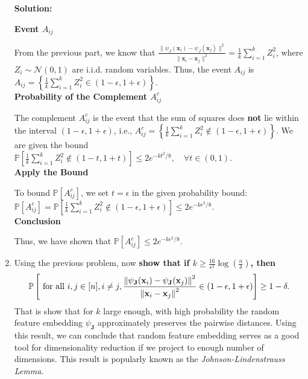 \documentclass{article}
\newcommand{\mat}[1]{\mathbf{#1}}
\renewcommand{\vec}[1]{\boldsymbol{\mathbf{#1}}}
\newenvironment{solution}{\color{blue} \smallskip \textbf{Solution:}}{}
\begin{document}
\begin{enumerate}
\begin{solution}

\textbf{Event \(A_{ij}\)}

From the previous part, we know that \( \frac{\|\psi_J(\mathbf{x}_i) - \psi_J(\mathbf{x}_j)\|^2}{\|\mathbf{x}_i - \mathbf{x}_j\|^2} = \frac{1}{k} \sum_{i=1}^{k} Z_i^2 \), where \(Z_i \sim \mathcal{N}(0,1)\) are i.i.d. random variables. Thus, the event \(A_{ij}\) is \( A_{ij} = \left\{ \frac{1}{k} \sum_{i=1}^{k} Z_i^2 \in (1 - \epsilon, 1 + \epsilon) \right\} \).\\

\textbf{Probability of the Complement \(A_{ij}^c\)}

The complement \(A_{ij}^c\) is the event that the sum of squares does \textbf{not} lie within the interval \((1 - \epsilon, 1 + \epsilon)\), i.e., \( A_{ij}^c = \left\{ \frac{1}{k} \sum_{i=1}^{k} Z_i^2 \notin (1 - \epsilon, 1 + \epsilon) \right\} \). We are given the bound \( \mathbb{P}\left[ \frac{1}{k} \sum_{i=1}^{k} Z_i^2 \notin (1 - t, 1 + t) \right] \leq 2e^{-kt^2/8}, \quad \forall t \in (0, 1) \).\\

\textbf{Apply the Bound}

To bound \(\mathbb{P}[A_{ij}^c]\), we set \(t = \epsilon\) in the given probability bound: 
\( \mathbb{P}[A_{ij}^c] = \mathbb{P}\left[ \frac{1}{k} \sum_{i=1}^{k} Z_i^2 \notin (1 - \epsilon, 1 + \epsilon) \right] \leq 2e^{-k \epsilon^2 / 8} \).\\

\textbf{Conclusion}

Thus, we have shown that \( \mathbb{P}[A_{ij}^c] \leq 2e^{-k \epsilon^2 / 8} \).





\end{solution}

\newpage
\item Using the previous problem, now {\bf show that if 
$k \geq \frac{16}{\epsilon^2} \log\left(\frac{n}{\delta}\right)$, then }
\begin{align*}
	\mathbb{P}\left[ \text{ for all } i, j \in [\num], i\neq j, 
	\frac{\norm{\psi_{\mat J}(\vec x_i) - \psi_{\mat J}(\vec x_j)}^2}{\norm{\vec x_i - \vec x_j}^2} \in (1-\epsilon, 1+\epsilon) \right] 
	\geq 1-\delta.
\end{align*}
That is show that for $k$ large enough, with high probability the random feature embedding
$\psi_{\mat J}$ approximately preserves the pairwise distances.
Using this result, we can conclude that random feature embedding serves as a good tool for dimensionality reduction 
if we project to enough number of dimensions.
This result is popularly known as the \emph{Johnson-Lindenstrauss Lemma}.


\end{enumerate}
\end{document}
